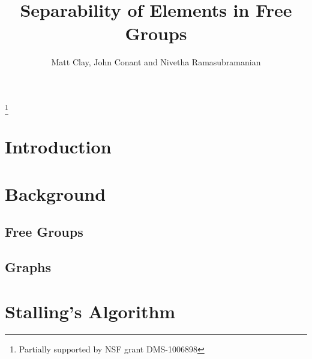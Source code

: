 \documentclass[12pt,reqno]{amsart}
\theoremstyle{plain}
\theoremstyle{definition}
\numberwithin{theorem}{section}
\numberwithin{exercise}{section}
\let\ssection=\section
\renewcommand{\section}{\setcounter{equation}{0}\ssection}
\begin{document}

\title[Separability of Elements in Free Groups]{Separability of
  Elements in Free Groups}

\author[M.~Clay, J.~Conant \& N.~Ramasubramanian]{Matt Clay, John
  Conant and Nivetha Ramasubramanian}
\address{Dept.\ of Mathematics \\
  Allegheny College\\
  Meadville, PA 16335}

\thanks{\tiny Partially supported by NSF grant DMS-1006898}

\begin{abstract}
\end{abstract}

\maketitle

\tableofcontents


\section{Introduction}\label{sec:intro}


\section{Background}\label{sec:background}


\subsection{Free Groups}\label{ssc:freegroups}


\subsection{Graphs}\label{ssc:graphs}


\section{Stalling's Algorithm}\label{sec:stallings}
\end{document}

